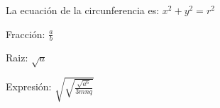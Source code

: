 \documentclass{article}
\begin{document}
La ecuación de la circunferencia es: $x^2+y^2=r^2$ 

Fracción: $\frac{a}{b}$

Raiz: $\sqrt{a}$

Expresión: $\sqrt{\sqrt{\frac{\sqrt{a^6}}{3mnq}}}$
\end{document}
